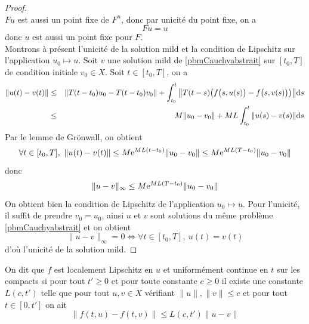 \begin{proof}
\begin{equation*}
    \end{equation*} 
    $Fu$ est aussi un point fixe de $F^n$, donc par unicité du point fixe, on a 
    \begin{equation*}
        Fu=u
    \end{equation*}
    donc $u$ est aussi un point fixe pour $F$.
    \\
    Montrons à présent l'unicité de la solution mild et la condition de Lipschitz sur l'application $u_0 \mapsto u$. Soit $v$ une solution mild de \eqref{pbmCauchyabstrait} sur $[t_0,T]$ de condition initiale $v_0 \in X$. Soit $t \in [t_0,T]$, on a 
    \begin{eqnarray*}
        \|u(t)-v(t)\| &\leq& \|T(t-t_0)u_0 -T(t-t_0)v_0\| + \int_{t_0}^t \big\|T(t-s)\big(f\big(s,u(s)\big)-f\big(s,v(s)\big)\big)\big\|\mathrm{d} s \\
        &\leq& M\|u_0-v_0\| +ML \int_{t_0}^t \|u(s)-v(s)\|\mathrm{d} s
    \end{eqnarray*}
    Par le lemme de Grönwall, on obtient 
    \begin{equation*}
        \forall t \in [t_0,T], \ \|u(t)-v(t)\| \leq M\mathrm{e}^{ML(t-t_0)}\|u_0-v_0\| \leq M\mathrm{e}^{ML(T-t_0)}\|u_0-v_0\|
    \end{equation*}
    donc 
    \begin{equation*}
        \|u-v\|_{\infty} \leq M\mathrm{e}^{ML(T-t_0)}\|u_0-v_0\|
    \end{equation*}
    On obtient bien la condition de Lipschitz de l'application $u_0 \mapsto u$. Pour l'unicité, il suffit de prendre $v_0=u_0$, ainsi $u$ et $v$ sont solutions du même problème \ref{pbmCauchyabstrait} et on obtient 
    \begin{equation*}
        \|u-v\|_{\infty}=0 \iff \forall t \in [t_0,T], \ u(t)=v(t)
    \end{equation*}
    d'où l'unicité de la solution mild.
\end{proof}

\begin{definition}
    On dit que $f$ est \textcolor{astral}{localement Lipschitz en $u$ et uniformément continue en $t$ sur les compacts} si pour tout $t'\geq 0$ et pour toute constante $c\geq 0$ il existe une constante $L(c,t')$ telle que pour tout $u,v \in X$ vérifiant $\|u\|, \|v\| \leq c$ et pour tout $t \in [0,t']$ on ait 
    \begin{equation*}
        \|f(t,u)-f(t,v)\| \leq L(c,t')\|u-v\|
    \end{equation*}
\end{definition}

